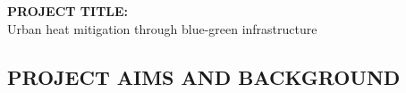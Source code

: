 %
%
%
%
%
%
%
%
%
%
%
%

\noindent \textbf{PROJECT TITLE: }\\ \noindent Urban heat mitigation through blue-green infrastructure

\subsection*{\TitleFont PROJECT AIMS AND BACKGROUND}



